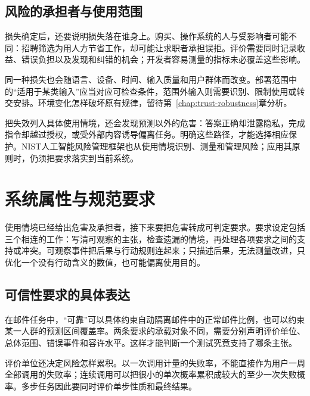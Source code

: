 \subsection{风险的承担者与使用范围}

损失确定后，还要说明损失落在谁身上。购买、操作系统的人与受影响者可能不同：招聘筛选为用人方节省工作，却可能让求职者承担误拒。评价需要同时记录收益、错误负担以及发现和纠错的机会；开发者容易测量的指标未必覆盖这些影响。

同一种损失也会随语言、设备、时间、输入质量和用户群体而改变。部署范围中的“适用于某类输入”应当对应可检查条件，范围外输入则需要识别、限制使用或转交安排。环境变化怎样破坏原有规律，留待第~\ref{chap:trust-robustness}章分析。

把失效列入具体使用情境，还会发现预测以外的危害：答案正确却泄露隐私，完成指令却越过授权，或受外部内容诱导偏离任务。明确这些路径，才能选择相应保护。NIST人工智能风险管理框架也从使用情境识别、测量和管理风险；应用其原则时，仍须把要求落实到当前系统。

\section{系统属性与规范要求}
\label{sec:trust-requirements}

使用情境已经给出危害及承担者，接下来要把危害转成可判定要求。要求设定包括三个相连的工作：写清可观察的主张，检查遗漏的情境，再处理各项要求之间的支持或冲突。可观察事件把后果与行动规则连起来；只描述后果，无法测量改进，只优化一个没有行动含义的数值，也可能偏离使用目的。

\subsection{可信性要求的具体表达}

在邮件任务中，“可靠”可以具体约束自动隔离邮件中的正常邮件比例，也可以约束某一人群的预测区间覆盖率。两条要求的承载对象不同，需要分别声明评价单位、总体范围、错误事件和容许水平。这样才能判断一个测试究竟支持了哪条主张。

评价单位还决定风险怎样累积。以一次调用计量的失败率，不能直接作为用户一周全部调用的失败率；连续调用可以把很小的单次概率累积成较大的至少一次失败概率。多步任务因此要同时评价单步性质和最终结果。

